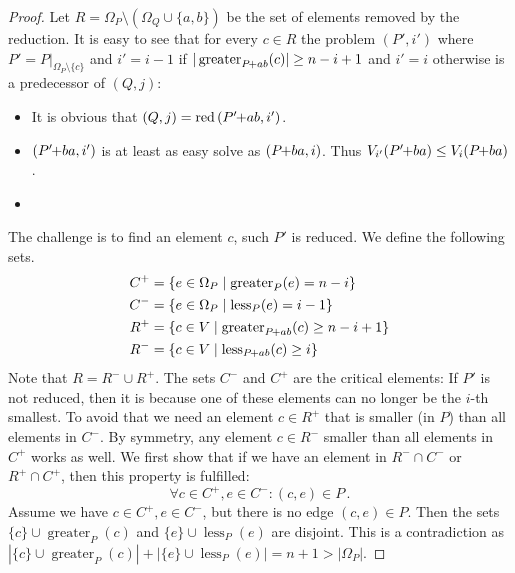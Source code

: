 \documentclass[twoside,leqno,twocolumn]{article}
\newcommand{\pchild}[3]{{#1}\kern-1pt{+}{#2}{#3}}
\newcommand{\reduced}[1]{\operatorname{red}{#1}}
\newcommand{\less}[2]{\operatorname{less}_{#1}(#2)}
\newcommand{\greater}[2]{\operatorname{greater}_{#1}(#2)}
\begin{document}
\begin{proof}
  Let $R = \Omega_P \setminus (\Omega_Q \cup \{a, b\})$ be the set of elements removed by the reduction.
  It is easy to see that for every $c \in R$ the problem $(P', i')$ where $P' = P|_{\Omega_P \setminus \{c\}}$ and $i' = i - 1$ if $|\greater{\pchild{P}{a}{b}}{c}| \ge n-i+1$ and $i'=i$ otherwise is a predecessor of $(Q, j)$:
  \begin{itemize}
    \item It is obvious that $(Q, j) = \reduced{(\pchild{P'}{a}{b}, i')}$.
    \item $(\pchild{P'}{b}{a}, i')$ is at least as easy solve as $(\pchild{P}{b}{a}, i)$. Thus $V_{i'}(\pchild{P'}{b}{a}) \le V_i(\pchild{P}{b}{a})$.
    \item {}
  \end{itemize}
  The challenge is to find an element $c$, such $P'$ is reduced.
  We define the following sets.
  \begin{align*}
    C^+ & = \{e \in \Omega_P \mid \greater{P}{e} = n - i \}               \\
    C^- & = \{e \in \Omega_P \mid \less{P}{e} = i - 1 \}                  \\
    R^+ & = \{c \in V \mid \greater{\pchild{P}{a}{b}}{c} \ge n - i + 1 \} \\
    R^- & = \{c \in V \mid \less{\pchild{P}{a}{b}}{c} \ge i \}
  \end{align*}
  Note that $R = R^- \cup R^+$.
  The sets $C^-$ and $C^+$ are the critical elements:
  If $P'$ is not reduced, then it is because one of these elements can no longer be the $i$-th smallest.
  To avoid that we need an element $c \in R^+$ that is smaller (in $P$) than all elements in $C^-$.
  By symmetry, any element $c \in R^-$ smaller than all elements in $C^+$ works as well.
  We first show that if we have an element in $R^- \cap C^-$ or $R^+ \cap C^+$, then this property is fulfilled:
  \begin{equation}
    \forall c \in C^+, e \in C^- \colon (c, e) \in P\,\text{.}
  \end{equation}
  Assume we have $c \in C^+, e \in C^-$, but there is no edge $(c, e) \in P$. Then the sets $\{c\} \cup \greater{P}{c}$ and $\{e\} \cup \less{P}{e}$ are disjoint.
  This is a contradiction as $|\{c\} \cup \greater{P}{c}| + |\{e\} \cup \less{P}{e}| = n + 1 > |\Omega_P|$.


\end{proof}
\end{document}

